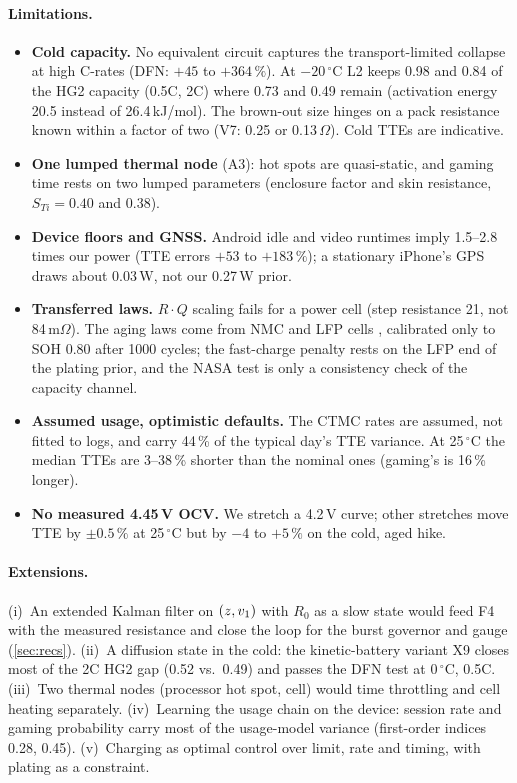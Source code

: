 \paragraph{Limitations.}
\begin{itemize}
  \item \textbf{Cold capacity.} No equivalent circuit captures the transport-limited collapse at high C-rates
  (DFN: $+45$ to $+364\,\%$). At $-20\,^\circ$C L2 keeps 0.98 and 0.84 of the HG2 capacity (0.5C, 2C) where 0.73
  and 0.49 remain (activation energy 20.5 instead of 26.4\,kJ/mol). The brown-out size hinges on a pack resistance
  known within a factor of two (V7: 0.25 or 0.13\,$\Omega$). Cold TTEs are indicative.
  \item \textbf{One lumped thermal node} (A3): hot spots are quasi-static, and gaming time rests on two lumped
  parameters (enclosure factor and skin resistance, $S_{Ti}=0.40$ and 0.38).
  \item \textbf{Device floors and GNSS.} Android idle and video runtimes imply 1.5--2.8 times our power (TTE
  errors $+53$ to $+183\,\%$); a stationary iPhone's GPS draws about 0.03\,W, not our 0.27\,W prior.
  \item \textbf{Transferred laws.} $R\cdot Q$ scaling fails for a power cell (step resistance 21, not
  84\,m$\Omega$). The aging laws come from NMC and LFP cells \cite{SCH14,SCM18}, calibrated only to SOH 0.80 after
  1000 cycles; the fast-charge penalty rests on the LFP end of the plating prior, and the NASA test is only a
  consistency check of the capacity channel.
  \item \textbf{Assumed usage, optimistic defaults.} The CTMC rates are assumed, not fitted to logs, and carry
  44\,\% of the typical day's TTE variance. At 25\,$^\circ$C the median TTEs are 3--38\,\% shorter than the
  nominal ones (gaming's is 16\,\% longer).
  \item \textbf{No measured 4.45\,V OCV.} We stretch a 4.2\,V curve; other stretches move TTE by $\pm0.5\,\%$ at
  25\,$^\circ$C but by $-4$ to $+5\,\%$ on the cold, aged hike.
\end{itemize}

\paragraph{Extensions.}
(i)~An extended Kalman filter on $(z,v_1)$ with $R_0$ as a slow state would feed F4 with the measured
resistance and close the loop for the burst governor and gauge (\cref{sec:recs}). (ii)~A diffusion state in the
cold: the kinetic-battery variant X9 \cite{MM93} closes most of the 2C HG2 gap (0.52 vs.\ 0.49) and passes the
DFN test at 0\,$^\circ$C, 0.5C. (iii)~Two thermal nodes (processor hot spot, cell) would time throttling and cell
heating separately. (iv)~Learning the usage chain on the device: session rate and gaming probability carry most of
the usage-model variance (first-order indices 0.28, 0.45). (v)~Charging as optimal control over limit, rate and
timing, with plating as a constraint.
